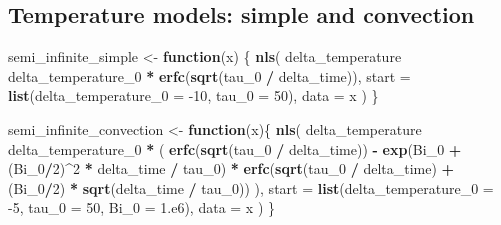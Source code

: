 \documentclass[]{book}
\newenvironment{Shaded}{\begin{snugshade}}{\end{snugshade}}
\newcommand{\ControlFlowTok}[1]{\textcolor[rgb]{0.13,0.29,0.53}{\textbf{#1}}}
\newcommand{\DataTypeTok}[1]{\textcolor[rgb]{0.13,0.29,0.53}{#1}}
\newcommand{\DecValTok}[1]{\textcolor[rgb]{0.00,0.00,0.81}{#1}}
\newcommand{\KeywordTok}[1]{\textcolor[rgb]{0.13,0.29,0.53}{\textbf{#1}}}
\newcommand{\NormalTok}[1]{#1}
\newcommand{\OperatorTok}[1]{\textcolor[rgb]{0.81,0.36,0.00}{\textbf{#1}}}
\newcommand{\StringTok}[1]{\textcolor[rgb]{0.31,0.60,0.02}{#1}}
\begin{document}
\hypertarget{temperature-models-simple-and-convection}{%
\subsection{Temperature models: simple and convection}\label{temperature-models-simple-and-convection}}

\begin{Shaded}
\begin{Highlighting}[]
\NormalTok{semi_infinite_simple <-}\StringTok{ }\ControlFlowTok{function}\NormalTok{(x) \{}
  \KeywordTok{nls}\NormalTok{(}
\NormalTok{    delta_temperature }\OperatorTok{~}\StringTok{ }\NormalTok{delta_temperature_}\DecValTok{0} \OperatorTok{*}\StringTok{ }\KeywordTok{erfc}\NormalTok{(}\KeywordTok{sqrt}\NormalTok{(tau_}\DecValTok{0} \OperatorTok{/}\StringTok{ }\NormalTok{delta_time)),}
    \DataTypeTok{start =} \KeywordTok{list}\NormalTok{(}\DataTypeTok{delta_temperature_0 =} \DecValTok{-10}\NormalTok{, }\DataTypeTok{tau_0 =} \DecValTok{50}\NormalTok{),}
    \DataTypeTok{data =}\NormalTok{ x}
\NormalTok{  )    }
\NormalTok{\}}

\NormalTok{semi_infinite_convection <-}\StringTok{ }\ControlFlowTok{function}\NormalTok{(x)\{}
  \KeywordTok{nls}\NormalTok{(}
\NormalTok{    delta_temperature }\OperatorTok{~}
\StringTok{      }\NormalTok{delta_temperature_}\DecValTok{0} \OperatorTok{*}\StringTok{ }\NormalTok{(}
        \KeywordTok{erfc}\NormalTok{(}\KeywordTok{sqrt}\NormalTok{(tau_}\DecValTok{0} \OperatorTok{/}\StringTok{ }\NormalTok{delta_time)) }\OperatorTok{-}
\StringTok{        }\KeywordTok{exp}\NormalTok{(Bi_}\DecValTok{0} \OperatorTok{+}\StringTok{ }\NormalTok{(Bi_}\DecValTok{0}\OperatorTok{/}\DecValTok{2}\NormalTok{)}\OperatorTok{^}\DecValTok{2} \OperatorTok{*}\StringTok{ }\NormalTok{delta_time }\OperatorTok{/}\StringTok{ }\NormalTok{tau_}\DecValTok{0}\NormalTok{) }\OperatorTok{*}
\StringTok{          }\KeywordTok{erfc}\NormalTok{(}\KeywordTok{sqrt}\NormalTok{(tau_}\DecValTok{0} \OperatorTok{/}\StringTok{ }\NormalTok{delta_time) }\OperatorTok{+}\StringTok{ }
\StringTok{        }\NormalTok{(Bi_}\DecValTok{0}\OperatorTok{/}\DecValTok{2}\NormalTok{) }\OperatorTok{*}\StringTok{ }\KeywordTok{sqrt}\NormalTok{(delta_time }\OperatorTok{/}\StringTok{ }\NormalTok{tau_}\DecValTok{0}\NormalTok{))}
\NormalTok{      ),}
    \DataTypeTok{start =} \KeywordTok{list}\NormalTok{(}\DataTypeTok{delta_temperature_0 =} \DecValTok{-5}\NormalTok{, }\DataTypeTok{tau_0 =} \DecValTok{50}\NormalTok{, }\DataTypeTok{Bi_0 =} \DecValTok{1}\NormalTok{.e6),}
    \DataTypeTok{data =}\NormalTok{ x}
\NormalTok{  )}
\NormalTok{\}}
\end{Highlighting}
\end{Shaded}
\end{document}
